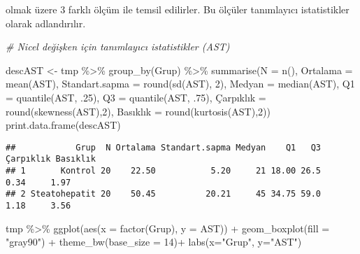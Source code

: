 \documentclass[
]{article}
\newenvironment{Shaded}{\begin{snugshade}}{\end{snugshade}}
\newcommand{\AttributeTok}[1]{\textcolor[rgb]{0.77,0.63,0.00}{#1}}
\newcommand{\CommentTok}[1]{\textcolor[rgb]{0.56,0.35,0.01}{\textit{#1}}}
\newcommand{\DecValTok}[1]{\textcolor[rgb]{0.00,0.00,0.81}{#1}}
\newcommand{\FunctionTok}[1]{\textcolor[rgb]{0.00,0.00,0.00}{#1}}
\newcommand{\NormalTok}[1]{#1}
\newcommand{\OtherTok}[1]{\textcolor[rgb]{0.56,0.35,0.01}{#1}}
\newcommand{\SpecialCharTok}[1]{\textcolor[rgb]{0.00,0.00,0.00}{#1}}
\newcommand{\StringTok}[1]{\textcolor[rgb]{0.31,0.60,0.02}{#1}}
\begin{document}
olmak üzere 3 farklı ölçüm ile temsil edilirler. Bu ölçüler tanımlayıcı
istatistikler olarak adlandırılır.

\begin{Shaded}
\begin{Highlighting}[]
\CommentTok{\# Nicel değişken için tanımlayıcı istatistikler (AST)}

\NormalTok{descAST }\OtherTok{\textless{}{-}}\NormalTok{ tmp }\SpecialCharTok{\%\textgreater{}\%}
  \FunctionTok{group\_by}\NormalTok{(Grup) }\SpecialCharTok{\%\textgreater{}\%}
  \FunctionTok{summarise}\NormalTok{(}\AttributeTok{N =} \FunctionTok{n}\NormalTok{(), }\AttributeTok{Ortalama =} \FunctionTok{mean}\NormalTok{(AST), }\AttributeTok{Standart.sapma =} \FunctionTok{round}\NormalTok{(}\FunctionTok{sd}\NormalTok{(AST), }\DecValTok{2}\NormalTok{), }\AttributeTok{Medyan =} \FunctionTok{median}\NormalTok{(AST),}
            \AttributeTok{Q1 =} \FunctionTok{quantile}\NormalTok{(AST, .}\DecValTok{25}\NormalTok{), }\AttributeTok{Q3 =} \FunctionTok{quantile}\NormalTok{(AST, .}\DecValTok{75}\NormalTok{), }
\NormalTok{            Çarpıklık }\OtherTok{=} \FunctionTok{round}\NormalTok{(}\FunctionTok{skewness}\NormalTok{(AST),}\DecValTok{2}\NormalTok{), Basıklık }\OtherTok{=} \FunctionTok{round}\NormalTok{(}\FunctionTok{kurtosis}\NormalTok{(AST),}\DecValTok{2}\NormalTok{))}
\FunctionTok{print.data.frame}\NormalTok{(descAST)}
\end{Highlighting}
\end{Shaded}

\begin{verbatim}
##            Grup  N Ortalama Standart.sapma Medyan    Q1   Q3 Çarpıklık Basıklık
## 1       Kontrol 20    22.50           5.20     21 18.00 26.5      0.34     1.97
## 2 Steatohepatit 20    50.45          20.21     45 34.75 59.0      1.18     3.56
\end{verbatim}

\par\medskip

\begin{Shaded}
\begin{Highlighting}[]
\NormalTok{tmp }\SpecialCharTok{\%\textgreater{}\%}
  \FunctionTok{ggplot}\NormalTok{(}\FunctionTok{aes}\NormalTok{(}\AttributeTok{x =} \FunctionTok{factor}\NormalTok{(Grup), }\AttributeTok{y =}\NormalTok{ AST)) }\SpecialCharTok{+} 
    \FunctionTok{geom\_boxplot}\NormalTok{(}\AttributeTok{fill =} \StringTok{"gray90"}\NormalTok{) }\SpecialCharTok{+}
    \FunctionTok{theme\_bw}\NormalTok{(}\AttributeTok{base\_size =} \DecValTok{14}\NormalTok{)}\SpecialCharTok{+}
  \FunctionTok{labs}\NormalTok{(}\AttributeTok{x=}\StringTok{"Grup"}\NormalTok{, }\AttributeTok{y=}\StringTok{"AST"}\NormalTok{)}
\end{Highlighting}
\end{Shaded}
\end{document}
